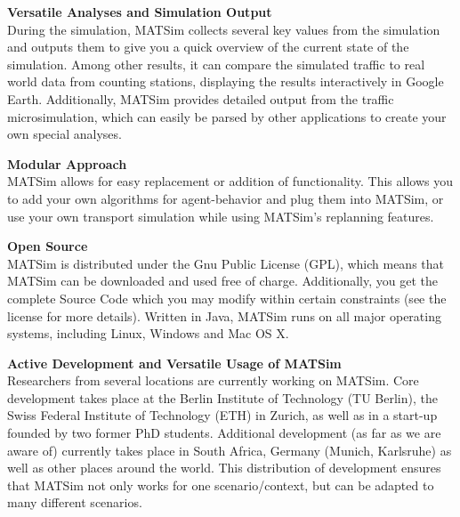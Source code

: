 \textbf{Versatile Analyses and Simulation Output}
\\  During the simulation, MATSim collects several key values from the  simulation and outputs them to give you a quick overview of the current  state of the simulation. Among other results, it can compare the  simulated traffic to real world data from counting stations, displaying  the results interactively in Google Earth. Additionally, MATSim provides  detailed output from the traffic microsimulation, which can easily be  parsed by other applications to create your own special analyses.

\textbf{Modular Approach
\\}MATSim  allows for easy replacement or addition of functionality. This allows  you to add your own algorithms for agent-behavior and plug them into  MATSim, or use your own transport simulation while using MATSim's  replanning features.

\textbf{Open Source}
\\ MATSim is  distributed under the Gnu Public License (GPL), which means that MATSim  can be downloaded and used free of charge. Additionally, you get the  complete Source Code which you may modify within certain constraints  (see the license for more details). Written in Java, MATSim runs on all  major operating systems, including Linux, Windows and Mac OS X.

\textbf{Active Development and Versatile Usage of MATSim}
\\  Researchers from several locations are currently working on MATSim.  Core development takes place at the Berlin Institute of Technology (TU  Berlin), the Swiss Federal Institute of Technology (ETH) in Zurich, as  well as in a start-up founded by two former PhD students. Additional  development (as far as we are aware of) currently takes place in South  Africa, Germany (Munich, Karlsruhe) as well as other places around the  world. This distribution of development ensures that MATSim not only  works for one scenario/context, but can be adapted to many different  scenarios.
